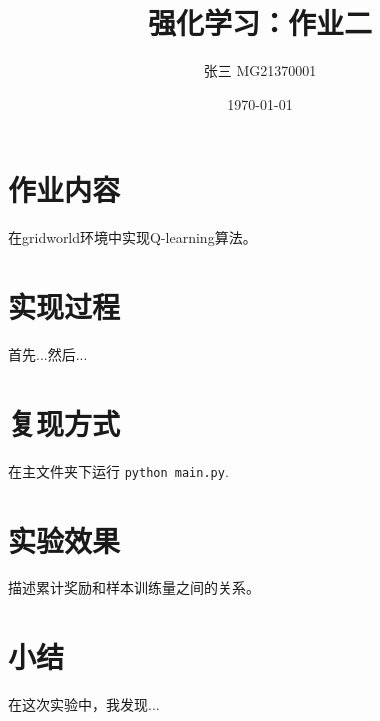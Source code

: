 \documentclass[a4paper,12pt]{article}
\begin{document}
\begin{CJK}{UTF8}{gbsn}

\title{强化学习：作业二}

\author{张三 MG21370001}

\date{\today}

\maketitle

\section{作业内容}
在gridworld环境中实现Q-learning算法。

\section{实现过程}

首先...然后...

\section{复现方式}
在主文件夹下运行 \texttt{python main.py}.
\section{实验效果}
描述累计奖励和样本训练量之间的关系。
\section{小结}
在这次实验中，我发现...



\end{CJK}
\end{document}

